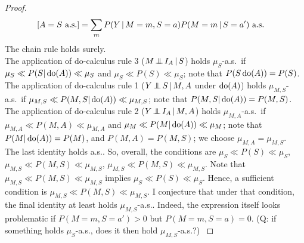 \begin{proof}
{\begin{equation*}
\begin{split}
  \text{[$A = S$ a.s.]} &= \sum_m P(Y \operatorname*{|} M=m, S=a) P(M=m \operatorname*{|} S=a') \text{ a.s.}
\end{split}\end{equation*}
The chain rule holds surely.\\
The application of do-calculus rule 3 ($M \operatorname*{\perp\mkern-11mu\perp} I_A \operatorname*{|} S$) holds $\mu_S$-a.s.\ if $\mu_S \ll P(S | \operatorname{do}(A)) \ll \mu_S$ and $\mu_S \ll P(S) \ll \mu_S$;
note that $P(S \operatorname{do}(A)) = P(S)$.\\
The application of do-calculus rule 1 ($Y \operatorname*{\perp\mkern-11mu\perp} S \operatorname*{|} M, A$ under $\operatorname{do}(A)$) holds $\mu_{M,S}$-a.s.\ if $\mu_{M,S} \ll P(M,S | \operatorname{do}(A)) \ll \mu_{M,S}$;
note that $P(M,S | \operatorname{do}(A)) = P(M,S)$.\\
The application of do-calculus rule 2 ($Y \operatorname*{\perp\mkern-11mu\perp} I_A \operatorname*{|} M, A$) holds $\mu_{M,A}$-a.s.\ if $\mu_{M,A} \ll P(M,A) \ll \mu_{M,A}$ and $\mu_{M} \ll P(M | \operatorname{do}(A)) \ll \mu_M$;
note that $P(M | \operatorname{do}(A)) = P(M)$, and $P(M,A) = P(M,S)$; we choose $\mu_{M,A} = \mu_{M,S}$.\\
The last identity holds a.s..
So, overall, the conditions are $\mu_S \ll P(S) \ll \mu_S$, $\mu_{M,S} \ll P(M,S) \ll \mu_{M,S}$, $\mu_{M,S} \ll P(M,S) \ll \mu_{M,S}$. 
Note that  $\mu_{M,S} \ll P(M,S) \ll \mu_{M,S}$ implies $\mu_S \ll P(S) \ll \mu_S$.
Hence, a sufficient condition is $\mu_{M,S} \ll P(M,S) \ll \mu_{M,S}$.
I conjecture that under that condition, the final identity at least holds $\mu_{M,S}$-a.s..
Indeed, the expression itself looks problematic if $P(M=m,S=a')>0$ but $P(M=m,S=a)=0$.
(Q: if something holds $\mu_S$-a.s., does it then hold $\mu_{M,S}$-a.s.?)
}


\end{proof}
